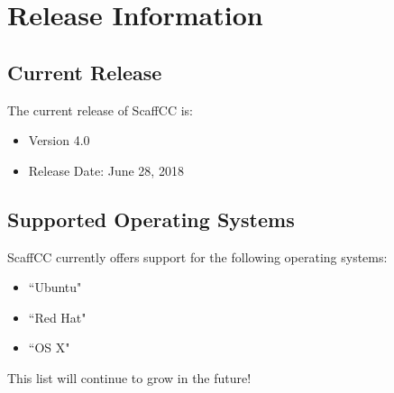 \chapter{Release Information}\label{ch:release}
\section{Current Release}
    The current release of ScaffCC is:
    \begin{itemize}
        \item Version 4.0
        \item Release Date: June 28, 2018
    \end{itemize}
\section{Supported Operating Systems}
    ScaffCC currently offers support for the following operating systems:
    \begin{itemize}
        \item ``Ubuntu"
        \item ``Red Hat"
        \item ``OS X"
    \end{itemize}
    This list will continue to grow in the future!

